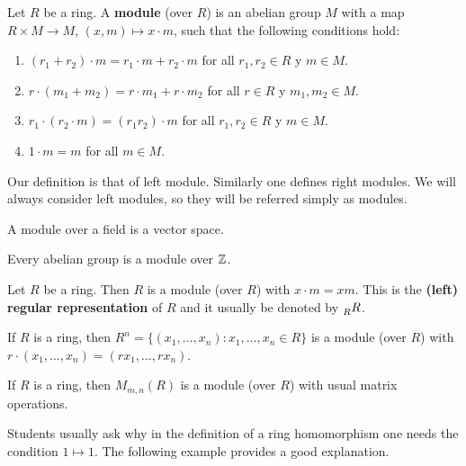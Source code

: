 \begin{definition}
    Let $R$ be a ring. A \textbf{module} (over $R$) is an abelian group
    $M$ with a map $R\times M\to M$, $(x,m)\mapsto x\cdot m$, such that
    the following conditions hold:
    \begin{enumerate}
        \item $(r_1+r_2)\cdot m=r_1\cdot m+r_2\cdot m$ for all $r_1,r_2\in R$ y $m\in M$.
		\item $r\cdot (m_1+m_2)=r\cdot m_1+r\cdot m_2$ for all $r\in R$ y $m_1,m_2\in M$.
		\item $r_1\cdot (r_2\cdot m)=(r_1r_2)\cdot m$ for all $r_1,r_2\in R$ y $m\in M$.
		\item $1\cdot m=m$ for all $m\in M$.	
    \end{enumerate}
\end{definition}

Our definition is that of left module. Similarly one defines right modules. We will always
consider left modules, so they will be referred simply as modules.

\begin{example}
A module over a field is a vector space. 
\end{example}

\begin{example}
Every abelian group is a module over $\mathbb{Z}$.	
\end{example}

\begin{example}
Let $R$ be a ring. Then $R$ is a module (over $R$) with $x\cdot m=xm$. 
This is the \textbf{(left) regular representation} of $R$ and it usually 
be denoted by $\prescript{}{R}R$. 
\end{example}

\begin{example}
If $R$ is a ring, then $R^n=\{(x_1,\dots,x_n):x_1,\dots,x_n\in R\}$ 
is a module (over $R$) with  
$r\cdot (x_1,\dots,x_n)=(rx_1,\dots,rx_n)$. 
\end{example}

\begin{example}
If $R$ is a ring, then $M_{m,n}(R)$ is a module (over $R$) with usual matrix operations. 
\end{example}

Students usually ask why in the definition of a ring homomorphism one needs
the condition $1\mapsto 1$. The following example provides a good explanation. 

